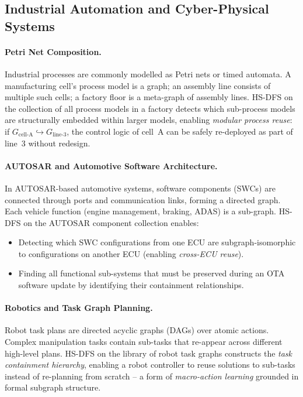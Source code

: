 ﻿\documentclass[12pt,a4paper]{article}
\theoremstyle{plain}
\theoremstyle{definition}
\theoremstyle{remark}
\begin{document}
	\subsection{Industrial Automation and Cyber-Physical Systems}
	\label{sec:automation}
	
	\paragraph{Petri Net Composition.}
	Industrial processes are commonly modelled as Petri nets or timed automata.
	A manufacturing cell's process model is a graph; an assembly line consists
	of multiple such cells; a factory floor is a meta-graph of assembly lines.
	HS-DFS on the collection of all process models in a factory detects which
	sub-process models are structurally embedded within larger models, enabling
	\emph{modular process reuse}: if $G_{\text{cell-A}} \hookrightarrow
	G_{\text{line-3}}$, the control logic of cell~A can be safely re-deployed
	as part of line~3 without redesign.
	
	\paragraph{AUTOSAR and Automotive Software Architecture.}
	In AUTOSAR-based automotive systems, software components (SWCs) are connected
	through ports and communication links, forming a directed graph.  Each
	vehicle function (engine management, braking, ADAS) is a sub-graph.
	HS-DFS on the AUTOSAR component collection enables:
	\begin{itemize}
		\item Detecting which SWC configurations from one ECU are
		subgraph-isomorphic to configurations on another ECU
		(enabling \emph{cross-ECU reuse}).
		\item Finding all functional sub-systems that must be preserved during
		an OTA software update by identifying their containment relationships.
	\end{itemize}
	
	\paragraph{Robotics and Task Graph Planning.}
	Robot task plans are directed acyclic graphs (DAGs) over atomic actions.
	Complex manipulation tasks contain sub-tasks that re-appear across different
	high-level plans.  HS-DFS on the library of robot task graphs constructs the
	\emph{task containment hierarchy}, enabling a robot controller to reuse
	solutions to sub-tasks instead of re-planning from scratch -- a form of
	\emph{macro-action learning} grounded in formal subgraph structure.
	
\end{document}
